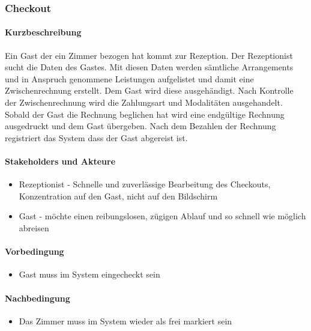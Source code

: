 \subsubsection{Checkout}
\label{UseCase_Checkout}

\paragraph{Kurzbeschreibung}
   Ein \Gls{Gast} der ein \Gls{Zimmer} bezogen hat kommt zur \Gls{Rezeption}.
   Der \Gls{Rezeptionist} sucht die Daten des \Gls{Gast}es. Mit diesen Daten
   werden sämtliche \Glspl{Arrangement} und in Anspruch genommene
   Leistungen aufgelistet und damit eine \Gls{Zwischenrechnung} erstellt.
   Dem \Gls{Gast} wird diese ausgehändigt. Nach Kontrolle der
   \Gls{Zwischenrechnung} wird die Zahlungsart und Modalitäten ausgehandelt.
   Sobald der \Gls{Gast} die \Gls{Rechnung} beglichen  hat wird eine endgültige
   Rechnung ausgedruckt und dem \Gls{Gast} übergeben.
   Nach dem  Bezahlen der \Gls{Rechnung} registriert das System dass der
   \Gls{Gast} abgereist ist.

\paragraph{Stakeholders und Akteure}
\begin{itemize}
	\item \Gls{Rezeptionist} - Schnelle und zuverlässige Bearbeitung des
	\Gls{Checkout}s, Konzentration auf den \Gls{Gast}, nicht auf den Bildschirm
	\item \Gls{Gast} - möchte einen reibungslosen, zügigen Ablauf und so schnell
	wie möglich abreisen
\end{itemize}

\paragraph{Vorbedingung}
\begin{itemize}
	\item Gast muss im System eingecheckt sein
\end{itemize}

\paragraph{Nachbedingung}
\begin{itemize}
	\item Das Zimmer muss im System wieder als frei markiert sein
\end{itemize}

